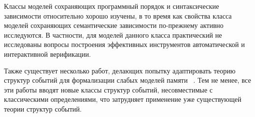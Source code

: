 Классы моделей сохраняющих программный порядок и синтаксические зависимости 
относительно хорошо изучены, в то время как свойства класса моделей 
сохраняющих семантические зависимости по-прежнему активно исследуются.
В частности, для моделей данного класса практический не исследованы
вопросы построения эффективных инструментов автоматической и интерактивной верификации. 

Также существует несколько работ, делающих попытку адаптировать 
теорию структур событий для формализации слабых моделей памяти%
~\autocite{Jeffrey-Riely:LICS16,PichonPharabod-Sewell:POPL16,Chakraborty-Vafeiadis:POPL19,Paviotti-al:ESOP20}. 
Тем не менее, все эти работы вводят новые классы структур событий, 
несовместимые с классическими определениями, что 
затрудняет применение уже существующей теории структур событий. 





  

